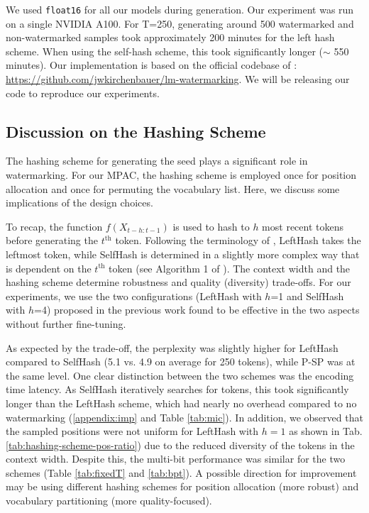 We used \texttt{float16} for all our models during generation. Our experiment was run on a single NVIDIA A100. For T=250, generating around 500 watermarked and non-watermarked samples took approximately 200 minutes for the left hash scheme. When using the self-hash scheme, this took significantly longer ($\sim$ 550 minutes). Our implementation is based on the official codebase of \cite{kirchenbauer2023watermark}: \url{https://github.com/jwkirchenbauer/lm-watermarking}. We will be releasing our code to reproduce our experiments.


\subsection{Discussion on the Hashing Scheme}\label{appendix:hash}
The hashing scheme for generating the seed plays a significant role in watermarking. For our MPAC, the hashing scheme is employed once for position allocation and once for permuting the vocabulary list. Here, we discuss some implications of the design choices. 

To recap, the function $f(X_{t-h:t-1})$ is used to hash to $h$ most recent tokens before generating the $t^\text{th}$ token. Following the terminology of \citet{kirchenbauer2023reliability}, LeftHash takes the leftmost token, while SelfHash is determined in a slightly more complex way that is dependent on the $t^\text{th}$ token (see Algorithm 1 of \citet{kirchenbauer2023reliability}). The context width and the hashing scheme determine robustness and quality (diversity) trade-offs. For our experiments, we use the two configurations (LeftHash with $h$=1 and SelfHash with $h$=4) proposed in the previous work found to be effective in the two aspects without further fine-tuning. 

As expected by the trade-off, the perplexity was slightly higher for LeftHash compared to SelfHash (5.1 vs. 4.9 on average for 250 tokens), while P-SP was at the same level. One clear distinction between the two schemes was the encoding time latency. As SelfHash iteratively searches for tokens, this took significantly longer than the LeftHash scheme, which had nearly no overhead compared to no watermarking (\cref{appendix:imp} and Table \ref{tab:mic}). In addition, we observed that the sampled positions were not uniform for LeftHash with $h=1$ as shown in Tab. \ref{tab:hashing-scheme-pos-ratio}) due to the reduced diversity of the tokens in the context width. Despite this, the multi-bit performance was similar for the two schemes (Table \ref{tab:fixedT} and \ref{tab:bpt}). A possible direction for improvement may be using different hashing schemes for position allocation (more robust) and vocabulary partitioning (more quality-focused). 



